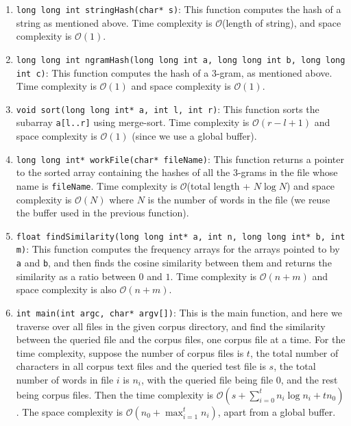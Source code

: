 \documentclass{article}
\begin{document}
\begin{enumerate}
    \item \texttt{long long int stringHash(char* s)}: This function computes the hash of a string as mentioned above. Time complexity is $\mathcal{O}$(length of string), and space complexity is $\mathcal{O}(1)$.
    \item \texttt{long long int ngramHash(long long int a, long long int b, long long int c)}: This function computes the hash of a $3$-gram, as mentioned above. Time complexity is $\mathcal{O}(1)$ and space complexity is $\mathcal{O}(1)$.
    \item \texttt{void sort(long long int* a, int l, int r)}: This function sorts the subarray \texttt{a[l..r]} using merge-sort. Time complexity is $\mathcal{O}(r - l + 1)$ and space complexity is $\mathcal{O}(1)$ (since we use a global buffer).
    \item \texttt{long long int* workFile(char* fileName)}: This function returns a pointer to the sorted array containing the hashes of all the $3$-grams in the file whose name is \texttt{fileName}. Time complexity is $\mathcal{O}$(total length + $N \log N$) and space complexity is $\mathcal{O}(N)$ where $N$ is the number of words in the file (we reuse the buffer used in the previous function).
    \item \texttt{float findSimilarity(long long int* a, int n, long long int* b, int m)}: This function computes the frequency arrays for the arrays pointed to by \texttt{a} and \texttt{b}, and then finds the cosine similarity between them and returns the similarity as a ratio between $0$ and $1$. Time complexity is $\mathcal{O}(n + m)$ and space complexity is also $\mathcal{O}(n + m)$.
    \item \texttt{int main(int argc, char* argv[])}: This is the main function, and here we traverse over all files in the given corpus directory, and find the similarity between the queried file and the corpus files, one corpus file at a time. 
        For the time complexity, suppose the number of corpus files is $t$, the total number of characters in all corpus text files and the queried test file is $s$, the total number of words in file $i$ is $n_i$, with the queried file being file $0$, and the rest being corpus files. Then the time complexity is $\mathcal{O}(s + \sum_{i = 0}^t n_i \log n_i + tn_0)$. The space complexity is $\mathcal{O}(n_0 + \max_{i = 1}^t n_i)$, apart from a global buffer.
\end{enumerate}
\end{document}
